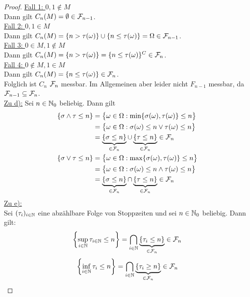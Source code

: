 \documentclass[12pt,a4paper]{article}
\begin{document}
\begin{proof}
\underline{Fall 1: $0,1\not\in M$}\\
Dann gilt $C_n(M)=\emptyset\in\mathcal{F}_{n-1}$.\\

\underline{Fall 2: $0,1\in M$}\\
Dann gilt $C_n(M)=\lbrace n>\tau(\omega)\rbrace\cup\lbrace n\leq\tau(\omega)\rbrace=\Omega\in\mathcal{F}_{n-1}$.\\

\underline{Fall 3: $0\in M,1\not\in M$}\\
Dann gilt $C_n(M)=\lbrace n>\tau(\omega)\rbrace=\lbrace n\leq\tau(\omega)\rbrace^C\in\mathcal{F}_{n}$.\\

\underline{Fall 4: $0\not\in M,1\in M$}\\
Dann gilt $C_n(M)=\lbrace n\leq\tau(\omega)\rbrace\in\mathcal{F}_{n}$.\\

Folglich ist $C_n$ $\mathcal{F}_n$ messbar. Im Allgemeinen aber leider nicht $F_{n-1}$ messbar, da $\mathcal{F}_{n-1}\subseteq\mathcal{F}_n$.\\

\underline{Zu d):} Sei $n\in\mathbb{N}_0$ beliebig. Dann gilt
\begin{align*}
\{\sigma \wedge \tau \leq n \}
&=\big\lbrace\omega\in\Omega:\min\lbrace\sigma(\omega),\tau(\omega)\rbrace\leq n\big\rbrace\\
&=\big\lbrace\omega\in\Omega:\sigma(\omega)\leq n\vee\tau(\omega)\leq n\big\rbrace\\
&=\underbrace{\{\sigma \leq n\}}_{\in \mathcal{F}_n} \cup \underbrace{\{\tau \leq n\}}_{\in\mathcal{F}_n} \in \mathcal{F}_n \\
\{\sigma \vee \tau \leq n \}
&=\big\lbrace\omega\in\Omega:\max\lbrace\sigma(\omega),\tau(\omega)\rbrace\leq n\big\rbrace\\
&=\big\lbrace\omega\in\Omega:\sigma(\omega)\leq n\wedge\tau(\omega)\leq n\big\rbrace\\
&=\underbrace{\{\sigma \leq n\}}_{\in \mathcal{F}_n} \cap \underbrace{\{\tau \leq n\}}_{\in\mathcal{F}_n} \in \mathcal{F}_n \\
\end{align*}
\underline{Zu e):}\\
Sei $(\tau_i)_{i\in\mathbb{N}}$ eine abzählbare Folge von Stoppzeiten und sei $n\in\mathbb{N}_0$ beliebig. Dann gilt:
\begin{align*}
\left\lbrace\sup_{i\in\mathbb{N}} \tau_{i\in\mathbb{N}} \leq n\right\rbrace
= \bigcap_{i\in\mathbb{N}}\underbrace{\{\tau_i \leq n\}}_{\in\mathcal{F}_n} \in \mathcal{F}_n
\end{align*}
\begin{align*}
\left\lbrace\inf_{i\in\mathbb{N}} \tau_{i} \leq n\right\rbrace = \bigcap_{i\in\mathbb{N}}\underbrace{\{\tau_i \geq n\}}_{\in\mathcal{F}_n} \in \mathcal{F}_n
\end{align*}

\end{proof}
\end{document}
